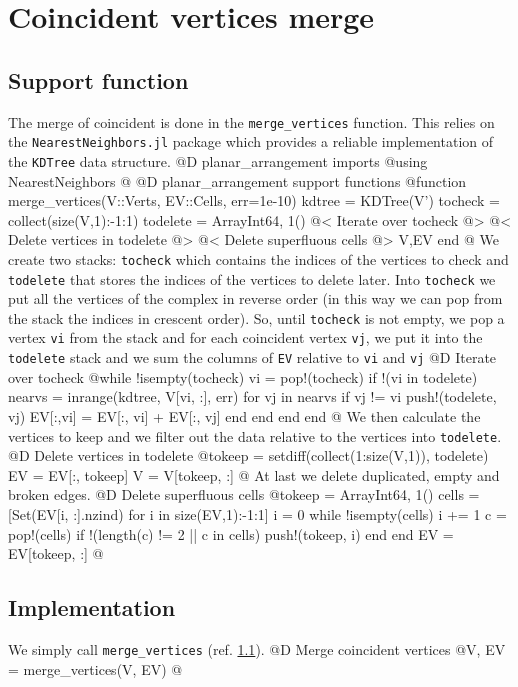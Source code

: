 \documentclass[10pt]{book}
\begin{document}
\section{Coincident vertices merge}
\subsection{Support function}
\label{sec:merge_vertices}
The merge of coincident is done in the \texttt{merge\_vertices}
function. This relies on the \texttt{NearestNeighbors.jl} package\cite{NearestNeighbors}
which provides a reliable implementation of the \texttt{KDTree} data structure.
@D planar\_arrangement imports
@{using NearestNeighbors
@}
@D planar\_arrangement support functions
@{function merge_vertices(V::Verts, EV::Cells, err=1e-10)
    kdtree = KDTree(V')
    tocheck = collect(size(V,1):-1:1)
    todelete = Array{Int64, 1}()
    @< Iterate over tocheck @>
    @< Delete vertices in todelete @>
    @< Delete superfluous cells @>
    V,EV
end
@}
We create two stacks: \texttt{tocheck} which contains the indices of the vertices
to check and \texttt{todelete} that stores the indices of the vertices to delete later.
Into \texttt{tocheck} we put all the vertices of the complex in reverse order (in
this way we can pop from the stack the indices in crescent order). So, until \texttt{tocheck} is not empty,
we pop a vertex \texttt{vi} from the stack and for each coincident vertex \texttt{vj}, we put it 
into the \texttt{todelete} stack and we sum the columns of \texttt{EV} relative to \texttt{vi} and \texttt{vj}
@D Iterate over tocheck 
@{while !isempty(tocheck)
    vi = pop!(tocheck)
    if !(vi in todelete)
        nearvs = inrange(kdtree, V[vi, :], err)
        for vj in nearvs
            if vj != vi
                push!(todelete, vj)
                EV[:,vi] = EV[:, vi] + EV[:, vj]
            end
        end
    end
end
@}
We then calculate the vertices to keep and we filter out
the data relative to the vertices into \texttt{todelete}.
@D Delete vertices in todelete
@{tokeep = setdiff(collect(1:size(V,1)), todelete)
EV = EV[:, tokeep]
V = V[tokeep, :]
@}
At last we delete duplicated, empty and broken edges.
@D Delete superfluous cells
@{tokeep = Array{Int64, 1}()
cells = [Set(EV[i, :].nzind) for i in size(EV,1):-1:1]
i = 0
while !isempty(cells)
    i += 1
    c = pop!(cells)
    if !(length(c) != 2 || c in cells)
        push!(tokeep, i)
    end
end
EV = EV[tokeep, :]
@}
\subsection{Implementation}
We simply call \texttt{merge\_vertices} (ref. \ref{sec:merge_vertices}).
@D Merge coincident vertices
@{V, EV = merge_vertices(V, EV)
@}
\end{document}
